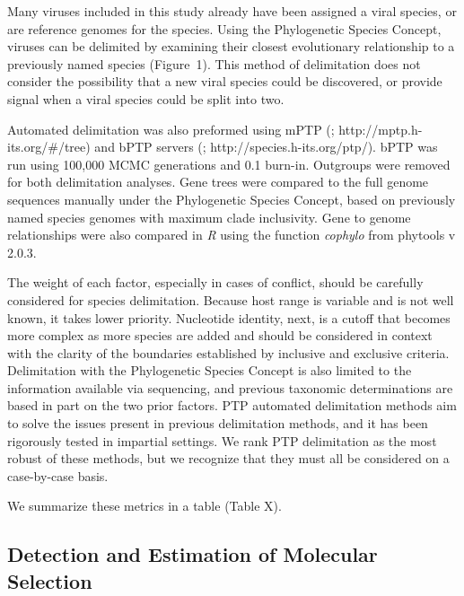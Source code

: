 \documentclass[fleqn,10pt,lineno]{wlpeerj}
\begin{document}
Many viruses included in this study already have been assigned a viral species, or are reference genomes for the species. 
Using the Phylogenetic Species Concept, viruses can be delimited by examining their closest evolutionary relationship to a previously named species (Figure~1). 
This method of delimitation does not consider the possibility that a new viral species could be discovered, or provide signal when a viral species could be split into two. 

Automated delimitation was also preformed using mPTP (\citealt{Kapli_2017}; http://mptp.h-its.org/\#/tree) and bPTP servers (\citealt{Zhang_2013}; http://species.h-its.org/ptp/). 
bPTP was run using 100,000 MCMC generations and 0.1 burn-in. 
Outgroups were removed for both delimitation analyses.
Gene trees were compared to the full genome sequences manually under the Phylogenetic Species Concept, based on previously named species genomes with maximum clade inclusivity.
Gene to genome relationships were also compared in \textit{R} using the function \textit{cophylo} from phytools v 2.0.3.

The weight of each factor, especially in cases of conflict, should be carefully considered for species delimitation. 
Because host range is variable and is not well known, it takes lower priority. 
Nucleotide identity, next, is a cutoff that becomes more complex as more species are added and should be considered in context with the clarity of the boundaries established by inclusive and exclusive criteria.
Delimitation with the Phylogenetic Species Concept is also limited to the information available via sequencing, and previous taxonomic determinations are based in part on the two prior factors. 
PTP automated delimitation methods aim to solve the issues present in previous delimitation methods, and it has been rigorously tested in impartial settings.
We rank PTP delimitation as the most robust of these methods, but we recognize that they must all be considered on a case-by-case basis.


We summarize these metrics in a table (Table X). %

\subsection*{Detection and Estimation of Molecular Selection}
\end{document}

